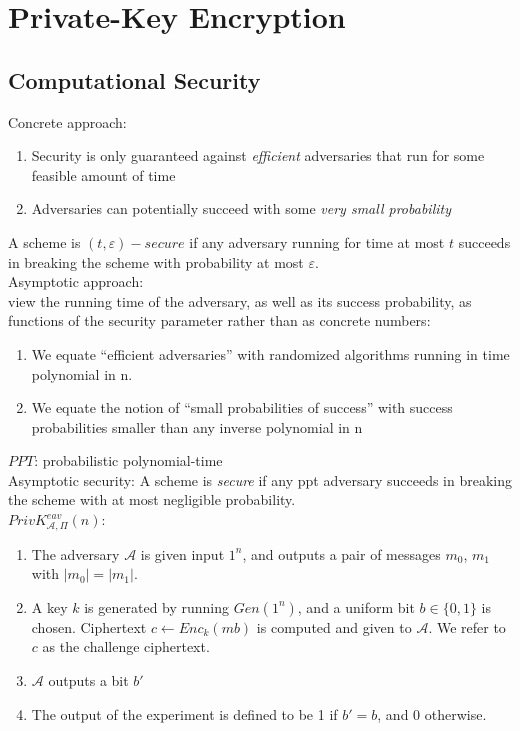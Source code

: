 \section{Private-Key Encryption}
\subsection*{Computational Security}
Concrete approach:
\begin{enumerate}
    \item Security is only guaranteed against \emph{efficient} 
    adversaries that run for some feasible amount of time
    \item Adversaries can potentially succeed
     with some \emph{very small probability}
\end{enumerate}

A scheme is $(t,\varepsilon)-secure$ if any adversary running for time at most
 $t$ succeeds in breaking the scheme with probability at most $\varepsilon$.\\

 Asymptotic approach:\\
view the running time of the adversary, as well as its success probability, 
 as functions of the security parameter rather than as concrete numbers:
 \begin{enumerate}
     \item We equate “efficient adversaries” with randomized 
     algorithms running in time polynomial in n.
     \item We equate the notion of “small probabilities of success” 
     with success probabilities smaller than any inverse polynomial in n
 \end{enumerate}
 $PPT$: probabilistic polynomial-time\\
 Asymptotic security: A scheme is \emph{secure} if any ppt adversary succeeds
  in breaking the scheme with at most negligible probability.\\


$PrivK^{eav}_{\mathcal{A},\Pi}(n)$: 
\begin{enumerate}
    \item The adversary $\mathcal{A}$ is given input $1^n$, and outputs a
     pair of messages $m_0$, $m_1$ with $|m_0| = |m_1|$.
    \item A key $k$ is generated by running $Gen(1^n)$, and a uniform bit
     $b \in \{0,1\}$ is chosen. Ciphertext $c \leftarrow Enc_k(mb)$ is computed
      and given to $\mathcal{A}$. We refer to $c$ as the challenge ciphertext.
    \item $\mathcal{A}$ outputs a bit $b'$
    \item The output of the experiment is defined to be 1 if $b'=b$, and 0
    otherwise.
\end{enumerate}

